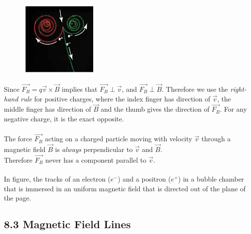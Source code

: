 \documentclass[12pt, a4paper]{article}
\begin{document}
		\begin{figure}
			\centering
			\includegraphics[width=4cm]{Physics2_PNGs/electron-positron.png}
			\caption*{}
			\label{fig:electron-positron.png}
		\end{figure}
		Since $\vec{F_B} = q \vec{v} \times \vec{B}$ implies that $\vec{F_B} \perp \vec{v}$, and $\vec{F_B} \perp \vec{B}$. Therefore we use the \textit{right-hand rule} for positive charges, where the index finger has direction of $\vec{v}$, the middle finger has direction of $\vec{B}$ and the thumb gives the direction of $\vec{F_B}$. For any negative charge, it is the exact opposite. \\ \\
		The force $\vec{F_B}$ acting on a charged particle moving with velocity $\vec{v}$ through a magnetic field $\vec{B}$ is \textit{always} perpendicular to $\vec{v}$ and $\vec{B}$. \\ 
		Therefore $\vec{F_B}$ never has a component parallel to $\vec{v}$. \\
		\\ In figure, the tracks of an electron ($e^-$) and a positron ($e^+$) in a bubble chamber that is immersed in an uniform magnetic field that is directed out of the plane of the page.
		
		
		
		\subsection*{8.3 Magnetic Field Lines}
		
\end{document}
